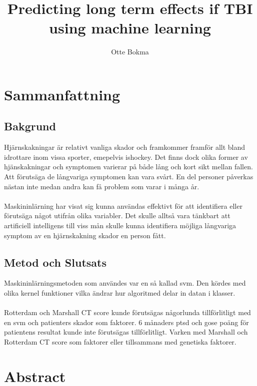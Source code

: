 \documentclass[11pt]{article}
\title{Predicting long term effects if TBI using machine learning}
\author{Otte Bokma}
\begin{document}
\begin{titlepage}
\maketitle
\end{titlepage}

\section*{Sammanfattning}

\subsection*{Bakgrund}

Hjärnskakningar är relativt vanliga skador och framkommer framför allt bland idrottare inom vissa sporter, emepelvis ishockey\cite{TraumaticBrainInjury}. Det finns dock olika former av hjänskakningar och symptomen varierar på både lång och kort sikt mellan fallen. Att förutsäga de långvariga symptomen kan vara svårt. En del personer påverkas nästan inte medan andra kan få problem som varar i många år.\cite{TraumaticBrainInjury2021}\\
\\
Maskininlärning har visat sig kunna användas effektivt för att identifiera eller förutsäga något utifrån olika variabler\cite{MachineLearning2021}. Det skulle alltså vara tänkbart att artificiell intelligens till viss mån skulle kunna identifiera möjliga långvariga symptom av en hjärnskakning skador en person fått.

\subsection*{Metod och Slutsats}
Maskininlärningsmetoden som användes var en så kallad \gls{svm}. Den kördes med olika kernel funktioner vilka ändrar hur algoritmed delar in datan i klasser\cite{KernelMethod2021}.\cite{jamesSupportVectorMachines}\\
\\
Rotterdam och Marshall CT score kunde förutsägas någorlunda tillförlitligt med en \gls{svm} och patienters skador som faktorer. 6 månaders \gls{ptsd} och \gls{gose} poäng för patientens resultat kunde inte förutsägas tillförlitligt. Varken med Marshall och Rotterdam CT score som faktorer eller tillsammans med genetiska faktorer.

\section*{Abstract}
\end{document}
